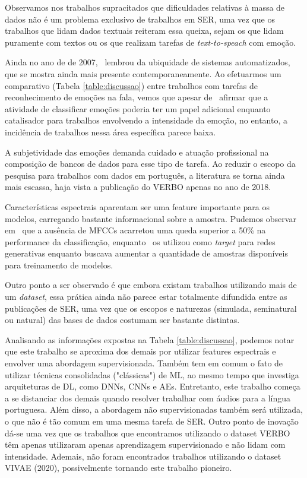 Observamos nos trabalhos supracitados que dificuldades relativas à massa de dados não é um problema exclusivo de trabalhos em \acrshort{SER}, uma vez que os trabalhos que lidam dados textuais reiteram essa queixa, sejam os que lidam puramente com textos ou os que realizam tarefas de \textit{text-to-speach} com emoção.

Ainda no ano de de 2007,~\cite{32.32} lembrou da ubiquidade de sistemas automatizados, que se mostra ainda mais presente contemporaneamente. Ao efetuarmos um comparativo (Tabela \ref{table:discussao}) entre trabalhos com tarefas de reconhecimento de emoções na fala, vemos que apesar de~\cite{14} afirmar que a atividade de classificar emoções poderia ter um papel adicional enquanto catalisador para trabalhos envolvendo a intensidade da emoção, no entanto, a incidência de trabalhos nessa área específica parece baixa.

A subjetividade das emoções demanda cuidado e atuação profissional na composição de bancos de dados para esse tipo de tarefa. Ao reduzir o escopo da pesquisa para trabalhos com dados em português, a literatura se torna ainda mais escassa, haja vista a publicação do VERBO apenas no ano de 2018.

Características espectrais aparentam ser uma feature importante para os modelos, carregando bastante informacional sobre a amostra. Pudemos observar em~\cite{11} que a ausência de \acrshort{MFCC}s acarretou uma queda superior a 50\% na performance da classificação, enquanto~\cite{34} os utilizou como \textit{target} para redes generativas enquanto buscava aumentar a quantidade de amostras disponíveis para treinamento de modelos.

Outro ponto a ser observado é que embora existam trabalhos utilizando mais de um \textit{dataset}, essa prática ainda não parece estar totalmente difundida entre as publicações de \acrshort{SER}, uma vez que os escopos e naturezas (simulada, seminatural ou natural) das bases de dados costumam ser bastante distintas.

Analisando as informações expostas na Tabela \ref{table:discussao}, podemos notar que este trabalho se aproxima dos demais por utilizar features espectrais e envolver uma abordagem supervisionada. Também tem em comum o fato de utilizar técnicas consolidadas ("clássicas") de \acrshort{ML}, ao mesmo tempo que investiga arquiteturas de \acrshort{DL}, como \acrshort{DNN}s, \acrshort{CNN}s e \acrshort{AE}s. Entretanto, este trabalho começa a se distanciar dos demais quando resolver trabalhar com áudios para a língua portuguesa. Além disso, a abordagem não supervisionadas também será utilizada, o que não é tão comum em uma mesma tarefa de \acrshort{SER}. Outro ponto de inovação dá-se uma vez que os trabalhos que encontramos utilizando o dataset VERBO têm apenas utilizaram apenas aprendizagem supervisionado e não lidam com intensidade. Ademais, não foram encontrados trabalhos utilizando o dataset VIVAE (2020), possivelmente tornando este trabalho pioneiro.


